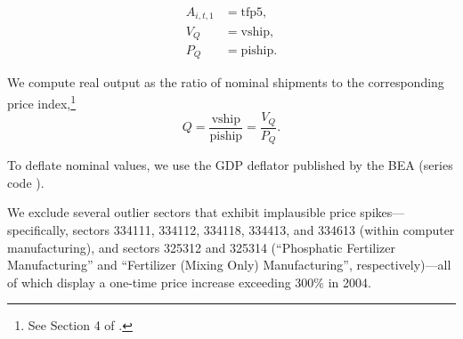 \documentclass[11pt]{article}
\begin{document}
\begin{align*}
A_{i,t,1} &= \text{tfp5}, \\
V_Q &= \text{vship}, \\
P_Q &= \text{piship}.
\end{align*}

\noindent
We compute real output as the ratio of nominal shipments to the corresponding price index,\footnote{See Section 4 of \cite{beckerNBERCESManufacturingIndustry2013}.}
\begin{equation}
    Q = \frac{\text{vship}}{\text{piship}} = \frac{V_Q}{P_Q}.
\end{equation}

\noindent
To deflate nominal values, we use the GDP deflator published by the BEA (series code ).

\medskip

\noindent
We exclude several outlier sectors that exhibit implausible price spikes—specifically, sectors 334111, 334112, 334118, 334413, and 334613 (within computer manufacturing), and sectors 325312 and 325314 (“Phosphatic Fertilizer Manufacturing” and “Fertilizer (Mixing Only) Manufacturing”, respectively)—all of which display a one-time price increase exceeding 300\% in 2004.





\tiny
\renewcommand\bibname{References}


\normalsize
\end{document}
